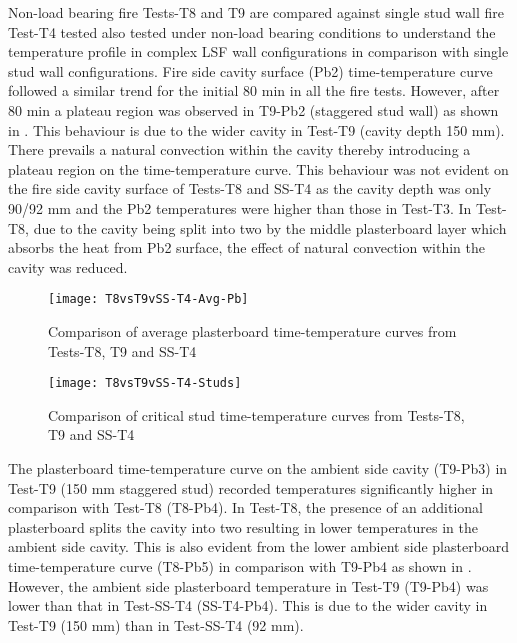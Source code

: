 Non-load bearing fire Tests-T8 and T9 are compared against single stud wall fire Test-T4 tested also tested under non-load bearing conditions to understand the temperature profile in complex LSF wall configurations in comparison with single stud wall configurations. Fire side cavity surface (Pb2) time-temperature curve followed a similar trend for the initial 80 min in all the fire tests. However, after 80 min a plateau region was observed in T9-Pb2 (staggered stud wall) as shown in . This behaviour is due to the wider cavity in Test-T9 (cavity depth 150 mm). There prevails a natural convection within the cavity thereby introducing a plateau region on the time-temperature curve. This behaviour was not evident on the fire side cavity surface of Tests-T8 and SS-T4 as the cavity depth was only 90/92 mm and the Pb2 temperatures were higher than those in Test-T3. In Test-T8, due to the cavity being split into two by the middle plasterboard layer which absorbs the heat from Pb2 surface, the effect of natural convection within the cavity was reduced.
\begin{figure}[!htbp]
	\centering
		\texttt{[image: T8vsT9vSS-T4-Avg-Pb]}  
	\caption{Comparison of average plasterboard time-temperature curves from Tests-T8, T9 and SS-T4}
	\label{fig:T8vsT9vSS-T4-Avg-Pb}
\end{figure}
\begin{figure}[!htbp]
	\centering
		\texttt{[image: T8vsT9vSS-T4-Studs]}  
	\caption{Comparison of critical stud time-temperature curves from Tests-T8, T9 and SS-T4}
	\label{fig:T8vsT9vSS-T4-Studs}
\end{figure}

The plasterboard time-temperature curve on the ambient side cavity (T9-Pb3) in Test-T9 (150 mm staggered stud) recorded temperatures significantly higher in comparison with Test-T8 (T8-Pb4). In Test-T8, the presence of an additional plasterboard splits the cavity into two resulting in lower temperatures in the ambient side cavity. This is also evident from the lower ambient side plasterboard time-temperature curve (T8-Pb5) in comparison with T9-Pb4 as shown in . However, the ambient side plasterboard temperature in Test-T9 (T9-Pb4) was lower than that in Test-SS-T4 (SS-T4-Pb4). This is due to the wider cavity in Test-T9 (150 mm) than in Test-SS-T4 (92 mm).

